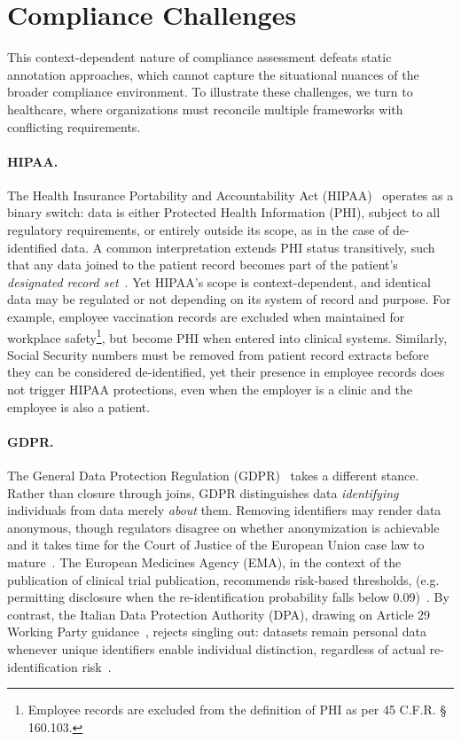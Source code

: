 \documentclass{IOS-Book-Article}
\begin{document}
\section{Compliance Challenges}\label{sec:legal}

This context-dependent nature of compliance assessment defeats static annotation approaches, which cannot capture the situational nuances of the broader compliance environment. To illustrate these challenges, we turn to healthcare, where organizations must reconcile multiple frameworks with conflicting requirements.

\paragraph{HIPAA.}
The Health Insurance Portability and Accountability Act (HIPAA)~\cite{hipaa-privacy} operates as a binary switch: data is either Protected Health Information (PHI), subject to all regulatory requirements, or entirely outside its scope, as in the case of de-identified data. A common interpretation extends PHI status transitively, such that any data joined to the patient record becomes part of the patient’s \emph{designated record set}~\cite{hipaa-privacy}. Yet HIPAA’s scope is context-dependent, and identical data may be regulated or not depending on its system of record and purpose. For example, employee vaccination records are excluded when maintained for workplace safety\footnote{Employee records are excluded from the definition of PHI as per 45 C.F.R. § 160.103.}, but become PHI when entered into clinical systems. Similarly, Social Security numbers must be removed from patient record extracts before they can be considered de-identified, yet their presence in employee records does not trigger HIPAA protections, even when the employer is a clinic and the employee is also a patient.


\paragraph{GDPR.}
The General Data Protection Regulation (GDPR)~\cite{gdpr} takes a different stance. Rather than closure through joins, GDPR distinguishes data \emph{identifying} individuals from data merely \emph{about} them. Removing identifiers may render data anonymous, though regulators disagree on whether anonymization is achievable~\cite{stalla_rossi_2021,stalla_2025} and it takes time for the Court of Justice of the European Union case law to mature~\cite{srb}. The European Medicines Agency (EMA), in the context of the publication of clinical trial publication, recommends risk-based thresholds, (e.g. permitting disclosure when the re-identification probability falls below 0.09)~\cite{ema_external_guidance_2016,ema_external_guidance_2025}. By contrast, the Italian Data Protection Authority (DPA), drawing on Article 29 Working Party guidance~\cite{wp29-anonymization}, rejects singling out: datasets remain personal data whenever unique identifiers enable individual distinction, regardless of actual re-identification risk~\cite{italian-thin-2023}.
\end{document}
